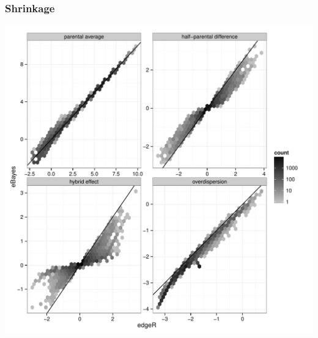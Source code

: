 \documentclass[handout]{beamer}\usepackage[]{graphicx}\usepackage[]{color}
\begin{document}
\begin{frame}
\frametitle{Shrinkage}
\begin{center}
\includegraphics{gene_specific_estimates}
\end{center}
\end{frame}

\end{document}
